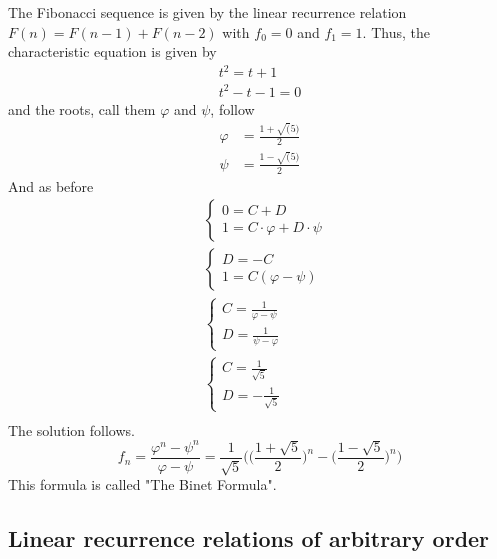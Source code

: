 \begin{exmp}
The Fibonacci sequence is given by the linear recurrence relation $F(n)=F(n-1)+F(n-2)$ with $f_0=0$ and $f_1=1$. Thus,
the characteristic equation is given by
\begin{align*}
t^2=t+1\\
t^2-t-1=0
\end{align*}
and the roots, call them $\varphi$ and $\psi$, follow
\begin{align*}
\varphi &= \frac{1 + \sqrt(5)}{2}\\
\psi &= \frac{1 - \sqrt(5)}{2}
\end{align*}
And as before
\begin{align*}
    &\begin{cases}
        0 = C + D\\    
        1 = C \cdot \varphi + D \cdot \psi   
    \end{cases}\\
    &\begin{cases}
        D = -C\\    
        1 = C (\varphi - \psi)   
    \end{cases}\\
    &\begin{cases}
        C = \frac{1}{\varphi - \psi}\\    
        D = \frac{1}{\psi - \varphi}   
    \end{cases}\\
    &\begin{cases}
        C = \frac{1}{\sqrt{5}}\\    
        D = -\frac{1}{\sqrt{5}}   
    \end{cases}\\
\end{align*}
The solution follows.
$$
f_n= \frac{\varphi^n - \psi^n}{\varphi - \psi} = \frac{1}{\sqrt{5}}\biggr (\biggr(\frac{1 + \sqrt{5}}{2}\biggl )^n - \biggr( \frac{1- \sqrt{5}}{2} \biggr )^n \biggr )
$$
This formula is called "The Binet Formula".
\end{exmp}

\subsection{Linear recurrence relations of arbitrary order}

